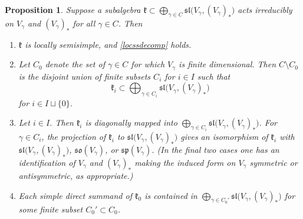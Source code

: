 \documentclass{article}
\def\sl{\mathfrak{sl}}
\def\so{\mathfrak{so}}
\def\sp{\mathfrak{sp}}
\def\k{\mathfrak{k}}
\newtheorem{prop}[thm]{Proposition}
\begin{document}
\begin{prop} \label{irreducibleeverywhere}
Suppose a subalgebra $\k \subset \bigoplus_{\gamma \in C} \sl \big(V_\gamma , (V_\gamma)_* \big)$ acts irreducibly on $V_\gamma$ and $(V_\gamma)_*$ for all $\gamma \in C$.  Then

\begin{enumerate}
\item \label{uno} $\k$ is locally semisimple, and \eqref{locssdecomp} holds.

\item \label{dos} Let $C_0$ denote the set of $\gamma \in C$ for which $V_\gamma$ is finite dimensional.  Then $C \setminus C_0$ is the disjoint union of finite subsets $C_i$ for $i \in I$ such that
$$\k_i \subset \bigoplus_{\gamma \in C_i} \sl \big( V_\gamma , (V_\gamma)_* \big)$$
for $i \in I \sqcup \{0\}$.  

\item \label{tres} Let $i \in I$.  Then $\k_i$ is diagonally mapped into $\bigoplus_{\gamma \in C_i} \sl \big( V_\gamma , (V_\gamma)_* \big)$.  For $\gamma \in C_i$, the projection of $\k_i$ to $\sl \big( V_\gamma , (V_\gamma)_* \big)$ gives an isomorphism of $\k_i$ with $\sl \big(V_\gamma, (V_\gamma)_* \big)$, $\so(V_\gamma)$, or $\sp(V_\gamma)$. (In the final two cases one has an identification of $V_\gamma$ and $(V_\gamma)_*$ making the induced form on $V_\gamma$ symmetric or antisymmetric, as appropriate.)

\item \label{quatro} Each simple direct summand of $\k_0$ is contained in $\bigoplus_{\gamma \in C_0'} \sl \big( V_\gamma , (V_\gamma)_* \big)$ for some finite subset $C_0' \subset C_0$.
\end{enumerate}
\end{prop}
\end{document}
